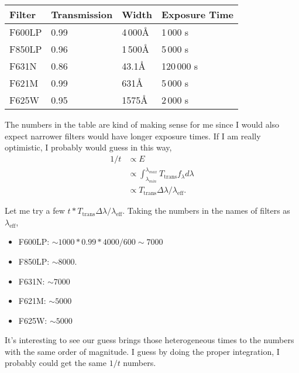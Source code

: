 \documentclass[12pt,letterpaper]{article}
\begin{document}
\begin{enumerate}
\begin{tabular}{ |p{3cm} || p{3cm}|p{3cm}|p{3cm}| }
        Filter& Transmission&     Width& Exposure Time\\
        \hline

        F600LP& 0.99        & 4\,000\AA& 1\,000   s   \\
        F850LP& 0.96        & 1\,500\AA& 5\,000   s   \\
        F631N & 0.86        &   43.1\AA& 120\,000 s   \\
        F621M & 0.99        &    631\AA& 5\,000   s   \\
        F625W & 0.95        &   1575\AA& 2\,000   s   \\
        \hline
    \end{tabular}

    The numbers in the table are kind of making sense for me 
    since I would also expect narrower filters
    would have longer exposure times.
    If I am really optimistic, I probably would guess in this way, 
    \begin{equation}
        \begin{split}
            1 / t &\propto E\\
              &\propto \int_{\lambda_{min}}^{\lambda_{max}} T_{\mathrm{trans}} f_\lambda d\lambda\\
              &\propto     T_{\mathrm{trans}}  \Delta \lambda / \lambda_{\mathrm{eff}}.
        \end{split}
    \end{equation}

    Let me try a few $t * T_{\mathrm{trans}} \Delta \lambda / \lambda_\mathrm{eff}$. 
    Taking the numbers in the names of filters as $\lambda_\mathrm{eff}$,

    \begin{itemize}
        \item F600LP: $\sim 1000 * 0.99 * 4000 / 600 \sim 7000$
        \item F850LP: $\sim 8000$.
        \item F631N:  $\sim 7000$
        \item F621M:  $\sim 5000$
        \item F625W:  $\sim 5000$
    \end{itemize}
    
    It's interesting to see our guess brings those heterogeneous times
    to the numbers with the same order of magnitude. 
    I guess by doing the proper integration, I probably could get the 
    same $1/t$ numbers.

\end{enumerate}
\end{document}
